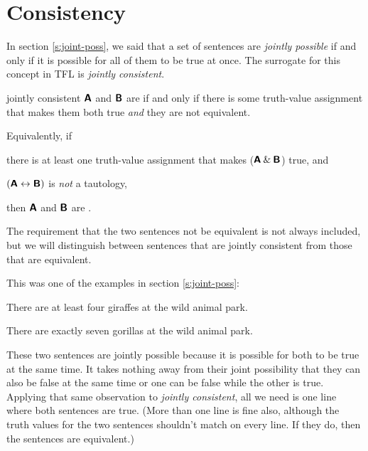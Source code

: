 \section{Consistency}\label{consistency--tt}
In section \ref{s:joint-poss}, we said that a set of sentences are \textit{jointly possible} if and only if it is possible for all of them to be true at once. The surrogate for this concept in TFL is \textit{jointly consistent}. 

\begin{factboxy}{jointly consistent}
$\bm{\mathsf{A}}$ and $\bm{\mathsf{B}}$ are  if and only if there is some truth-value assignment that makes them both true \textit{and} they are not equivalent.
\medskip
		
Equivalently, if
\begin{earg}
\vspace{-2mm}
	\item[(1)] there is at least one truth-value assignment that makes ($\bm{\mathsf{A}}\mathbin{\&}\bm{\mathsf{B}}$) true, and
	\item[(2)] $(\bm{\mathsf{A}} \leftrightarrow \bm{\mathsf{B}})$ is \textit{not} a tautology,
\vspace{-2mm}
\end{earg}		
then $\bm{\mathsf{A}}$ and $\bm{\mathsf{B}}$ are .
\end{factboxy}

\noindent The requirement that the two sentences not be equivalent is not always included, but we will distinguish between sentences that are jointly consistent from those that are equivalent. 

This was one of the examples in section \ref{s:joint-poss}:
\begin{ebullet}	
		\item[G1.] There are at least four giraffes at the wild animal park.
		\item[G2.] There are exactly seven gorillas at the wild animal park.
	\end{ebullet}
These two sentences are jointly possible because it is possible for both to be true at the same time. It takes nothing away from their joint possibility that they can also be false at the same time or one can be false while the other is true. Applying that same observation to \textit{jointly consistent}, all we need is one line where both sentences are true. (More than one line is fine also, although the truth values for the two sentences shouldn't match on every line. If they do, then the sentences are equivalent.) 

